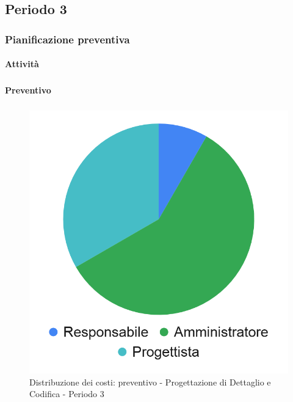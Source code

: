 \pagebreak
\subsection{Periodo 3}

\subsubsection{Pianificazione preventiva}

\paragraph{Attività}
\subparagraph*{}

\planningTable{
	
}

\paragraph{Preventivo}
\subparagraph*{}

\hspace{-1cm}
\begin{minipage}{.50\textwidth}
\smallPreventivoTable{
	
}
\end{minipage}
\hspace{1cm}
\begin{minipage}{.40\textwidth}
\begin{figure}[H]
	\includegraphics[scale=0.21]{res/images/charts/preventivo_priori/Grafico4-8.png}
	\caption{Distribuzione dei costi: preventivo - Progettazione di Dettaglio e Codifica - Periodo 3}
\end{figure}
\end{minipage} 



